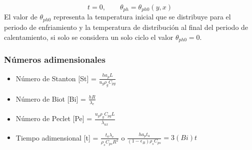 \documentclass[12pt,letterpaper,final]{article}%
\begin{document}
\begin{equation}
	t=0, \qquad \theta_{ph} = \theta_{ph0}(y,x)
\end{equation}
El valor de $\theta_{ph0}$ representa la temperatura inicial que se distribuye para el periodo de enfriamiento y la temperatura de distribución al final del periodo de calentamiento, si solo se considera un solo ciclo el valor $\theta_{ph0}=0$.
\newline
\subsubsection*{Números adimensionales}
\begin{itemize}
	\item Número de Stanton [St] = $\frac{h a_p L}{u_g \rho_g C_{pg}}$
	\item Número de Biot [Bi] = $\frac{h R}{\lambda_e}$
	\item Número de Peclet [Pe] = $\frac{ u_g \rho_g C_{pg} L}{\lambda_{ax}}$
	\item Tiempo adimensional [t] = $\frac{t_a \lambda_e}{\rho_s C_{ps} R^2}$ o $ \frac{h a_p t_a }{(1-\epsilon_B)\rho_s C_{ps}} = 3 (Bi) t $
	
\end{itemize}
\end{document}
